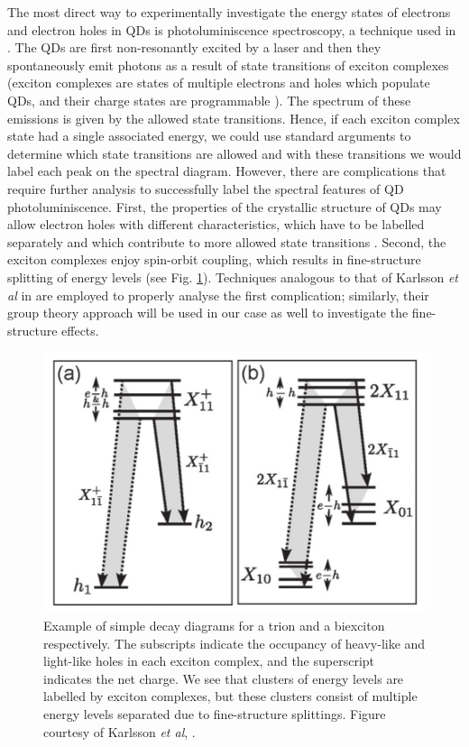 \documentclass[12pt]{article}
\begin{document}
The most direct way to experimentally investigate the energy states of electrons and electron holes in QDs is photoluminiscence spectroscopy, a technique used in \cite{karlsson}. The QDs are first non-resonantly excited by a laser and then they spontaneously emit photons as a result of state transitions of exciton complexes (exciton complexes are states of multiple electrons and holes which populate QDs, and their charge states are programmable \cite{charge_state}). The spectrum of these emissions is given by the allowed state transitions. Hence, if each exciton complex state had a single associated energy, we could use standard arguments to determine which state transitions are allowed and with these transitions we would label each peak on the spectral diagram. However, there are complications that require further analysis to successfully label the spectral features of QD photoluminiscence. First, the properties of the crystallic structure of QDs may allow electron holes with different characteristics, which have to be labelled separately and which contribute to more allowed state transitions \cite{karlsson2}. Second, the exciton complexes enjoy spin-orbit coupling, which results in fine-structure splitting of energy levels \cite{fine-structure} (see Fig. \ref{fig:decay_diagrams}). Techniques analogous to that of Karlsson \textit{et al} in \cite{karlsson} are employed to properly analyse the first complication; similarly, their group theory approach will be used in our case as well to investigate the fine-structure effects.

\begin{figure}
\begin{center}
\includegraphics[scale=0.3]{figures/example_decay_diagrams}
\end{center}
\caption{Example of simple decay diagrams for a trion and a biexciton respectively. The subscripts indicate the occupancy of heavy-like and light-like holes in each exciton complex, and the superscript indicates the net charge. We see that clusters of energy levels are labelled by exciton complexes, but these clusters consist of multiple energy levels separated due to fine-structure splittings. Figure courtesy of Karlsson \textit{et al}, \cite{karlsson}.}
\label{fig:decay_diagrams}
\end{figure}
	
\end{document}
